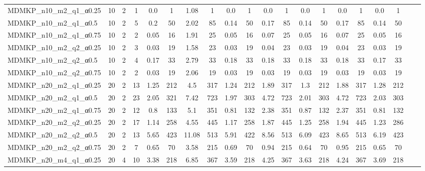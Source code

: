 \begin{table}
{\begin{tabular}{lccccccccccccccccccc}
MDMKP\_n10\_m2\_q1\_α0.25 & 10 & 2 & 1 &  \textcolor{blue2}{0.0} & 1 & 1.08 & 1 &  \textcolor{blue2}{0.0} & 1 &  \textcolor{blue2}{0.0} & 1 &  \textcolor{blue2}{0.0} & 1 &  \textcolor{blue2}{0.0} & 1 &  \textcolor{blue2}{0.0} & 1 \\
MDMKP\_n10\_m2\_q1\_α0.5 & 10 & 2 & 5 & 0.2 & 50 & 2.02 & 85 &  \textcolor{blue2}{0.14} & 50 & 0.17 & 85 &  \textcolor{blue2}{0.14} & 50 & 0.17 & 85 &  \textcolor{blue2}{0.14} & 50 \\
MDMKP\_n10\_m2\_q1\_α0.75 & 10 & 2 & 2 &  \textcolor{blue2}{0.05} & 16 & 1.91 & 25 &  \textcolor{blue2}{0.05} & 16 & 0.07 & 25 &  \textcolor{blue2}{0.05} & 16 & 0.07 & 25 &  \textcolor{blue2}{0.05} & 16 \\
MDMKP\_n10\_m2\_q2\_α0.25 & 10 & 2 & 3 &  \textcolor{blue2}{0.03} & 19 & 1.58 & 23 &  \textcolor{blue2}{0.03} & 19 & 0.04 & 23 &  \textcolor{blue2}{0.03} & 19 & 0.04 & 23 &  \textcolor{blue2}{0.03} & 19 \\
MDMKP\_n10\_m2\_q2\_α0.5 & 10 & 2 & 4 &  \textcolor{blue2}{0.17} & 33 & 2.79 & 33 & 0.18 & 33 & 0.18 & 33 & 0.18 & 33 & 0.18 & 33 &  \textcolor{blue2}{0.17} & 33 \\
MDMKP\_n10\_m2\_q2\_α0.75 & 10 & 2 & 2 &  \textcolor{blue2}{0.03} & 19 & 2.06 & 19 &  \textcolor{blue2}{0.03} & 19 &  \textcolor{blue2}{0.03} & 19 &  \textcolor{blue2}{0.03} & 19 &  \textcolor{blue2}{0.03} & 19 &  \textcolor{blue2}{0.03} & 19 \\
MDMKP\_n20\_m2\_q1\_α0.25 & 20 & 2 & 13 & 1.25 & 212 & 4.5 & 317 & 1.24 & 212 & 1.89 & 317 & 1.3 & 212 & 1.88 & 317 & 1.28 & 212 \\
MDMKP\_n20\_m2\_q1\_α0.5 & 20 & 2 & 23 & 2.05 & 321 & 7.42 & 723 & 1.97 & 303 & 4.72 & 723 & 2.01 & 303 & 4.72 & 723 & 2.03 & 303 \\
MDMKP\_n20\_m2\_q1\_α0.75 & 20 & 2 & 12 & 0.8 & 133 & 5.1 & 351 & 0.81 & 132 & 2.38 & 351 & 0.87 & 132 & 2.37 & 351 & 0.81 & 132 \\
MDMKP\_n20\_m2\_q2\_α0.25 & 20 & 2 & 17 & 1.14 & 258 & 4.55 & 445 & 1.17 & 258 & 1.87 & 445 & 1.25 & 258 & 1.94 & 445 & 1.23 & 286 \\
MDMKP\_n20\_m2\_q2\_α0.5 & 20 & 2 & 13 & 5.65 & 423 & 11.08 & 513 & 5.91 & 422 & 8.56 & 513 & 6.09 & 423 & 8.65 & 513 & 6.19 & 423 \\
MDMKP\_n20\_m2\_q2\_α0.75 & 20 & 2 & 7 & 0.65 & 70 & 3.58 & 215 & 0.69 & 70 & 0.94 & 215 & 0.64 & 70 & 0.95 & 215 & 0.65 & 70 \\
MDMKP\_n20\_m4\_q1\_α0.25 & 20 & 4 & 10 & 3.38 & 218 & 6.85 & 367 & 3.59 & 218 & 4.25 & 367 & 3.63 & 218 & 4.24 & 367 & 3.69 & 218 \\

\end{tabular}}
\end{table}
